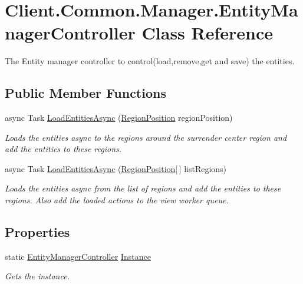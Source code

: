 \hypertarget{classClient_1_1Common_1_1Manager_1_1EntityManagerController}{}\section{Client.\+Common.\+Manager.\+Entity\+Manager\+Controller Class Reference}
\label{classClient_1_1Common_1_1Manager_1_1EntityManagerController}


The Entity manager controller to control(load,remove,get and save) the entities.  


\subsection*{Public Member Functions}
\begin{DoxyCompactItemize}
\item 
async Task \hyperlink{classClient_1_1Common_1_1Manager_1_1EntityManagerController_a170d1ad624051207bde41fcba9882a8c}{Load\+Entities\+Async} (\hyperlink{classCore_1_1Models_1_1RegionPosition}{Region\+Position} region\+Position)
\begin{DoxyCompactList}\small\item\em Loads the entities async to the regions around the surrender center region and add the entities to these regions. \end{DoxyCompactList}\item 
async Task \hyperlink{classClient_1_1Common_1_1Manager_1_1EntityManagerController_a9082e4c083984882b905514eeb4e5ea0}{Load\+Entities\+Async} (\hyperlink{classCore_1_1Models_1_1RegionPosition}{Region\+Position}\mbox{[}$\,$\mbox{]} list\+Regions)
\begin{DoxyCompactList}\small\item\em Loads the entities async from the list of regions and add the entities to these regions. Also add the loaded actions to the view worker queue. \end{DoxyCompactList}\end{DoxyCompactItemize}
\subsection*{Properties}
\begin{DoxyCompactItemize}
\item 
static \hyperlink{classClient_1_1Common_1_1Manager_1_1EntityManagerController}{Entity\+Manager\+Controller} \hyperlink{classClient_1_1Common_1_1Manager_1_1EntityManagerController_ad3bded5714962f5182c966472f7e41d1}{Instance}
\begin{DoxyCompactList}\small\item\em Gets the instance. \end{DoxyCompactList}\end{DoxyCompactItemize}



